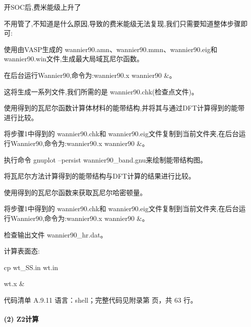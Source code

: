 \documentclass[lang=cn,scheme=chinese,color=blue,device=normal,toc=onecol,math=cm]{elegantbook}
\begin{document}
开SOC后,费米能级上升了\par


不用管了,不知道是什么原因,导致的费米能级无法复现,我们只需要知道整体步骤即可:\par


使用由VASP生成的 wannier90.amn、wannier90.mmn、wannier90.eig和 wannier90.win文件,生成最大局域瓦尼尔函数。\par


在后台运行Wannier90,命令为:wannier90.x wannier90 \&。\par


这将生成一系列文件,我们所需的是 wannier90.chk(检查点文件)。\par


使用得到的瓦尼尔函数计算体材料的能带结构,并将其与通过DFT计算得到的能带进行比较。\par


将步骤1中得到的 wannier90.chk和 wannier90.eig文件复制到当前文件夹,在后台运行Wannier90,命令为:wannier90.x wannier90 \&。\par


执行命令 gnuplot –persist wannier90\_\allowbreak{}band.gnu来绘制能带结构图。\par


将瓦尼尔方法计算得到的能带结构与DFT计算的结果进行比较。\par


使用得到的瓦尼尔函数来获取瓦尼尔哈密顿量。\par


将步骤1中得到的 wannier90.chk和 wannier90.eig文件复制到当前文件夹,在后台运行Wannier90,命令为:wannier90.x wannier90 \&。\par


检查输出文件 wannier90\_\allowbreak{}hr.dat。\par


计算表面态:\par


cp wt\_\allowbreak{}SS.in wt.in\par


wt.x \&\par


\begin{codeindexbox}{代码清单 A.9.11}
语言：shell；完整代码见附录第 \pageref{code:9:11} 页，共 63 行。
\end{codeindexbox}


\paragraph{(2) Z2计算}
\end{document}

